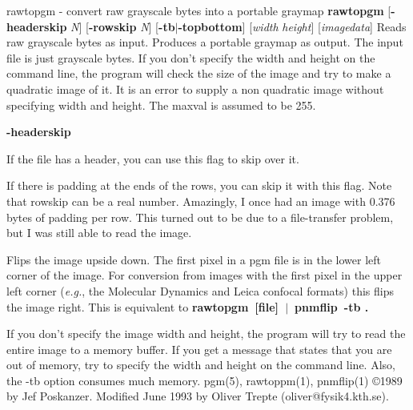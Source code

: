 rawtopgm - convert raw grayscale bytes into a portable graymap
{\bf rawtopgm}
{\rm [}{\bf -headerskip}
{\it N}{\rm ]}
{\rm [}{\bf -rowskip}
{\it N}{\rm ]}
{\rm [}{\bf -tb}{\rm $|$}{\bf -topbottom}{\rm ]}
{\rm [}{\it width}
{\it height}{\rm ]}
{\rm [}{\it imagedata}{\rm ]}
Reads raw grayscale bytes as input.
Produces a portable graymap as output.
The input file is just grayscale bytes.
If you don't specify the width and height on the command line,
the program will check the size of the image and try to make
a quadratic image of it. It is an error to supply a non
quadratic image without specifying width and height.
The maxval is assumed to be 255.
\begin{TPlist}{{\bf -headerskip}}
\item[{{\bf -headerskip}}]
If the file has a header, you can use this flag to
skip over it.
\item[{{\bf -rowskip}}]
If there is padding at the ends of the rows, you can skip it with this flag.
Note that rowskip can be a real number.
Amazingly, I once had an image with 0.376 bytes of padding per row.
This turned out to be due to a file-transfer problem, but I was still
able to read the image.
\item[{{\bf -tb -topbottom}}]
Flips the image upside down.
The first pixel in a pgm file is in the lower left corner of the image.
For conversion from images with the first pixel in the upper left corner
({\it e.g.}, the Molecular Dynamics and Leica confocal formats) this flips the
image right.
This is equivalent to
{\bf rawtopgm\ [file]\ $|$\ pnmflip\ -tb .}
\end{TPlist}

If you don't specify the image width and height, the program will
try to read the entire image to a memory buffer. If you get a
message that states that you are out of memory, try to specify the width
and height on the command line. Also, the -tb option consumes much
memory.
pgm(5), rawtoppm(1), pnmflip(1)
\copyright 1989 by Jef Poskanzer.
\nwl
Modified June 1993 by Oliver Trepte (oliver@fysik4.kth.se).
%
 

